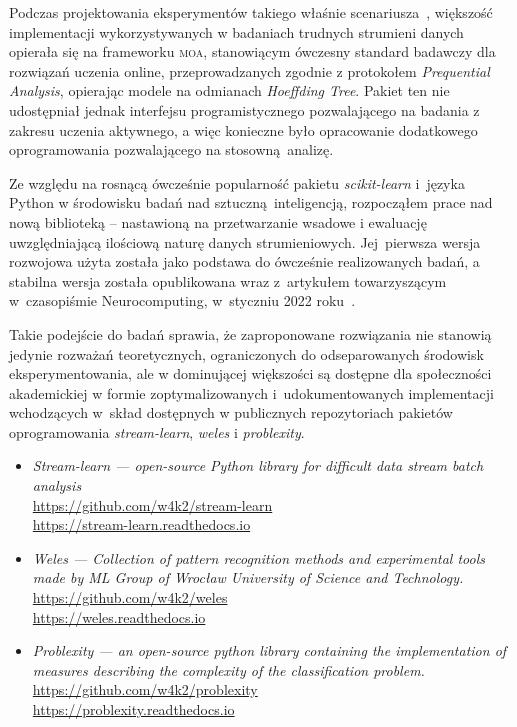 Podczas projektowania eksperymentów takiego właśnie scenariusza~, większość implementacji wykorzystywanych w badaniach trudnych strumieni danych opierała się na frameworku \textsc{moa}, stanowiącym ówczesny standard badawczy dla rozwiązań uczenia online, przeprowadzanych zgodnie z protokołem \emph{Prequential Analysis}, opierając modele na odmianach \emph{Hoeffding Tree}. Pakiet ten nie udostępniał jednak interfejsu programistycznego pozwalającego na badania z zakresu uczenia aktywnego, a więc konieczne było opracowanie dodatkowego oprogramowania pozwalającego na stosowną analizę.

Ze względu na rosnącą ówcześnie popularność pakietu \emph{scikit-learn} i~języka Python w środowisku badań nad sztuczną inteligencją, rozpocząłem prace nad nową biblioteką -- nastawioną na przetwarzanie wsadowe i ewaluację uwzględniającą ilościową naturę danych strumieniowych. Jej~pierwsza wersja rozwojowa użyta została jako podstawa do ówcześnie realizowanych badań, a stabilna wersja została opublikowana wraz z~artykułem towarzyszącym w~czasopiśmie Neurocomputing, w~styczniu 2022 roku~.

Takie podejście do badań sprawia, że zaproponowane rozwiązania nie stanowią jedynie rozważań teoretycznych, ograniczonych do odseparowanych środowisk eksperymentowania, ale w dominującej większości są dostępne dla społeczności akademickiej w formie zoptymalizowanych i~udokumentowanych implementacji wchodzących w~skład dostępnych w publicznych repozytoriach pakietów oprogramowania \emph{stream-learn}, \emph{weles} i \emph{problexity}.

\begin{itemize}
	\item \emph{Stream-learn — open-source Python library for difficult data stream batch analysis}\\%
	
	\url{https://github.com/w4k2/stream-learn}\\
	\url{https://stream-learn.readthedocs.io}\\
	\newpage
	
	\item \emph{Weles — Collection of pattern recognition methods and experimental tools made by ML Group of Wrocław University of Science and Technology.} \\%
	
	\url{https://github.com/w4k2/weles}\\
	\url{https://weles.readthedocs.io}\\

	\item \emph{Problexity — an open-source python library containing the implementation of measures describing the complexity of the classification problem.} \\%
	
	\url{https://github.com/w4k2/problexity}\\
	\url{https://problexity.readthedocs.io}\\	\vspace{1em}
\end{itemize}
 
